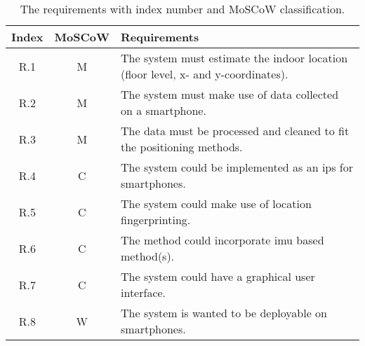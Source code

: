 \begin{table}[H]
\caption{The requirements with index number and MoSCoW classification.}
\begin{tabularx}{\textwidth}{| c | c | X |}
\hline
\textbf{Index} & \textbf{MoSCoW} & \textbf{Requirements}\\\hline
R.1 & M & The system must estimate the indoor location (floor level, x- and y-coordinates). \\\hline
R.2 & M & The system must make use of data collected on a smartphone.\\\hline
R.3 & M & The data must be processed and cleaned to fit the positioning methods.\\\hline
R.4 & C & The system could be implemented as an \gls{ips} for smartphones.\\\hline
R.5 & C & The system could make use of location fingerprinting.\\\hline
R.6 & C & The method could incorporate \gls{imu} based method(s).\\\hline
R.7 & C & The system could have a graphical user interface.\\\hline
R.8 & W & The system is wanted to be deployable on smartphones.\\\hline
\end{tabularx}
\label{table:requirements}
\end{table}